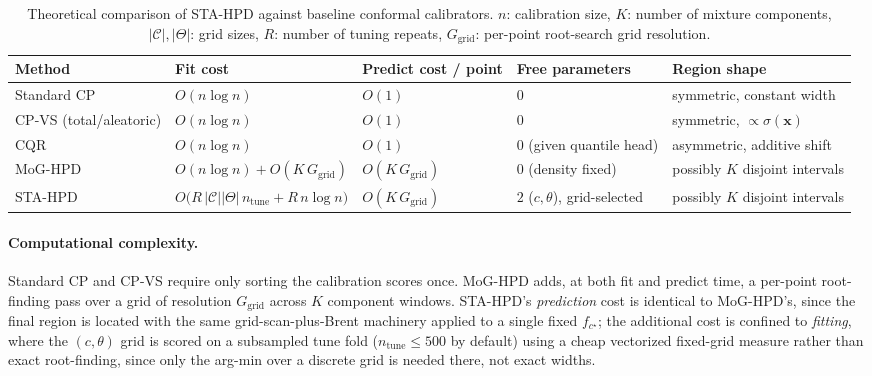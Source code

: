 \documentclass[10pt,twocolumn,a4paper]{article}
\begin{document}
\begin{table}[t]
\centering
\caption{Theoretical comparison of STA-HPD against baseline conformal calibrators. $n$: calibration
size, $K$: number of mixture components, $|\mathcal C|,|\Theta|$: grid sizes, $R$: number of tuning
repeats, $G_{\mathrm{grid}}$: per-point root-search grid resolution.}
\label{tab:comparison}
\begin{tabular}{@{}lllll@{}}
\toprule
\textbf{Method} & \textbf{Fit cost} & \textbf{Predict cost / point} & \textbf{Free parameters} & \textbf{Region shape} \\
\midrule
Standard CP & $O(n\log n)$ & $O(1)$ & $0$ & symmetric, constant width \\
CP-VS (total/aleatoric) & $O(n\log n)$ & $O(1)$ & $0$ & symmetric, $\propto \sigma(\bm x)$ \\
CQR & $O(n\log n)$ & $O(1)$ & $0$ (given quantile head) & asymmetric, additive shift \\
MoG-HPD & $O(n\log n) + O(K\,G_{\mathrm{grid}})$ & $O(K\,G_{\mathrm{grid}})$ & $0$ (density fixed) & possibly $K$ disjoint intervals \\
STA-HPD & $O\!\big(R\,|\mathcal C||\Theta|\,n_{\mathrm{tune}} + R\,n\log n\big)$ & $O(K\,G_{\mathrm{grid}})$ & $2$ ($c,\theta$), grid-selected & possibly $K$ disjoint intervals \\
\bottomrule
\end{tabular}
\end{table}

\paragraph{Computational complexity.} Standard CP and CP-VS require only sorting the calibration
scores once. MoG-HPD adds, at both fit and predict time, a per-point root-finding pass over a grid
of resolution $G_{\mathrm{grid}}$ across $K$ component windows. STA-HPD's \emph{prediction} cost is
identical to MoG-HPD's, since the final region is located with the same grid-scan-plus-Brent
machinery applied to a single fixed $f_{c^\star}$; the additional cost is confined to \emph{fitting},
where the $(c,\theta)$ grid is scored on a subsampled tune fold ($n_{\mathrm{tune}} \le 500$ by
default) using a cheap vectorized fixed-grid measure rather than exact root-finding, since only the
arg-min over a discrete grid is needed there, not exact widths.
\end{document}
